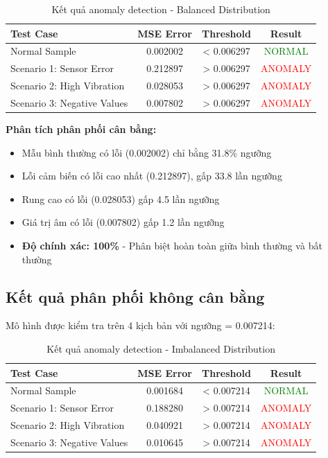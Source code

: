 \begin{table}[H]
\centering
\caption{Kết quả anomaly detection - Balanced Distribution}
\begin{tabular}{lccc}
\toprule
\textbf{Test Case} & \textbf{MSE Error} & \textbf{Threshold} & \textbf{Result} \\
\midrule
Normal Sample & 0.002002 & < 0.006297 & \textcolor{green}{NORMAL} \\
Scenario 1: Sensor Error & 0.212897 & > 0.006297 & \textcolor{red}{ANOMALY} \\
Scenario 2: High Vibration & 0.028053 & > 0.006297 & \textcolor{red}{ANOMALY} \\
Scenario 3: Negative Values & 0.007802 & > 0.006297 & \textcolor{red}{ANOMALY} \\
\bottomrule
\end{tabular}
\end{table}

\textbf{Phân tích phân phối cân bằng:}
\begin{itemize}
    \item Mẫu bình thường có lỗi (0.002002) chỉ bằng 31.8\% ngưỡng
    \item Lỗi cảm biến có lỗi cao nhất (0.212897), gấp 33.8 lần ngưỡng
    \item Rung cao có lỗi (0.028053) gấp 4.5 lần ngưỡng
    \item Giá trị âm có lỗi (0.007802) gấp 1.2 lần ngưỡng
    \item \textbf{Độ chính xác: 100\%} - Phân biệt hoàn toàn giữa bình thường và bất thường
\end{itemize}

\subsection{Kết quả phân phối không cân bằng}

Mô hình được kiểm tra trên 4 kịch bản với ngưỡng = 0.007214:

\begin{table}[H]
\centering
\caption{Kết quả anomaly detection - Imbalanced Distribution}
\begin{tabular}{lccc}
\toprule
\textbf{Test Case} & \textbf{MSE Error} & \textbf{Threshold} & \textbf{Result} \\
\midrule
Normal Sample & 0.001684 & < 0.007214 & \textcolor{green}{NORMAL} \\
Scenario 1: Sensor Error & 0.188280 & > 0.007214 & \textcolor{red}{ANOMALY} \\
Scenario 2: High Vibration & 0.040921 & > 0.007214 & \textcolor{red}{ANOMALY} \\
Scenario 3: Negative Values & 0.010645 & > 0.007214 & \textcolor{red}{ANOMALY} \\
\bottomrule
\end{tabular}
\end{table}


